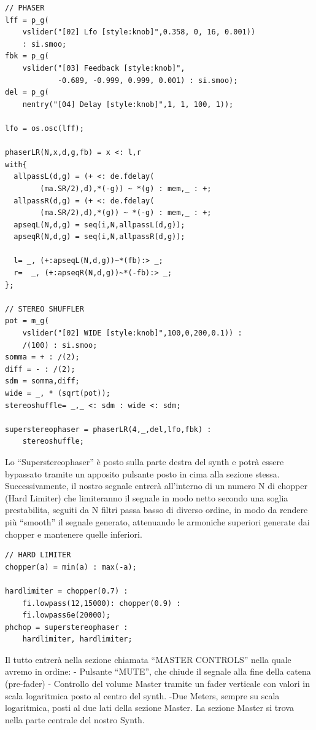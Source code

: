 \documentclass[
	a4paper,
	twocolumn
	]{article}
\begin{document}
\begin{lstlisting}
// PHASER
lff = p_g(
	vslider("[02] Lfo [style:knob]",0.358, 0, 16, 0.001))
	: si.smoo;
fbk = p_g(
	vslider("[03] Feedback [style:knob]",
	        -0.689, -0.999, 0.999, 0.001) : si.smoo);
del = p_g(
	nentry("[04] Delay [style:knob]",1, 1, 100, 1));

lfo = os.osc(lff);

phaserLR(N,x,d,g,fb) = x <: l,r
with{
  allpassL(d,g) = (+ <: de.fdelay(
		(ma.SR/2),d),*(-g)) ~ *(g) : mem,_ : +;
  allpassR(d,g) = (+ <: de.fdelay(
		(ma.SR/2),d),*(g)) ~ *(-g) : mem,_ : +;
  apseqL(N,d,g) = seq(i,N,allpassL(d,g));
  apseqR(N,d,g) = seq(i,N,allpassR(d,g));

  l= _, (+:apseqL(N,d,g))~*(fb):> _;
  r=  _, (+:apseqR(N,d,g))~*(-fb):> _;
};

// STEREO SHUFFLER
pot = m_g(
	vslider("[02] WIDE [style:knob]",100,0,200,0.1)) :
	/(100) : si.smoo;
somma = + : /(2);
diff = - : /(2);
sdm = somma,diff;
wide = _, * (sqrt(pot));
stereoshuffle= _,_ <: sdm : wide <: sdm;

superstereophaser = phaserLR(4,_,del,lfo,fbk) :
	stereoshuffle;
\end{lstlisting}

Lo “Superstereophaser” è posto sulla parte destra del synth e potrà essere bypassato tramite un apposito pulsante posto in cima alla sezione stessa.
Successivamente, il nostro segnale entrerà all’interno di un numero N di chopper (Hard Limiter) che limiteranno il segnale in modo netto secondo una soglia prestabilita, seguiti da N filtri passa basso di diverso ordine, in modo da rendere più “smooth” il segnale generato, attenuando le armoniche superiori generate dai chopper e mantenere quelle inferiori.

\begin{lstlisting}
// HARD LIMITER
chopper(a) = min(a) : max(-a);

hardlimiter = chopper(0.7) :
	fi.lowpass(12,15000): chopper(0.9) :
	fi.lowpass6e(20000);
phchop = superstereophaser :
	hardlimiter, hardlimiter;
 \end{lstlisting}

Il tutto entrerà nella sezione chiamata “MASTER CONTROLS” nella quale avremo in ordine:
- Pulsante “MUTE”, che chiude il segnale alla fine della catena (pre-fader)
- Controllo del volume Master tramite un fader verticale con valori in scala logaritmica posto al centro del synth.
-Due Meters, sempre su scala logaritmica, posti al due lati della sezione Master.
La sezione Master si trova nella parte centrale del nostro Synth.
\end{document}
